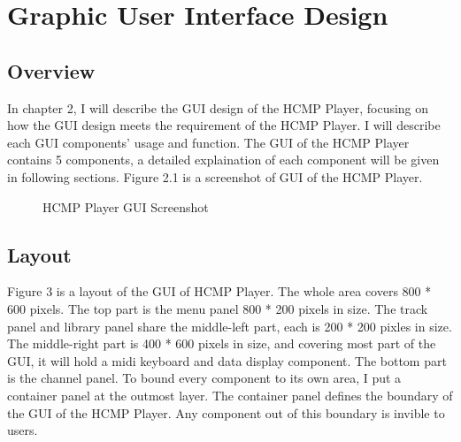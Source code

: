 
\chapter{Graphic User Interface Design} %

\section{Overview}
In chapter 2, I will describe the GUI design of the HCMP Player, focusing 
on how the GUI design meets the requirement of the HCMP Player. I will describe
each GUI components' 
usage and function. The GUI of the HCMP Player contains 5 components, 
a detailed explaination of each component will be given in following sections. 
Figure 2.1 is a screenshot of GUI of the HCMP Player. 

\begin{figure}[H]
\caption{HCMP Player GUI Screenshot}
\label{fig:speciation}
\end{figure}

\section{Layout}
Figure 3 is a layout of the GUI of HCMP Player. The whole area 
covers 800 * 600 pixels. The top part is the menu panel 800 * 200 pixels in size. 
The track panel and 
library panel share the middle-left part, each is 200 * 200 pixles in size. 
The middle-right part is 400 * 600 pixels in size, and covering most part of the GUI, 
it will hold a midi keyboard and data display component. The bottom part is the channel   
panel. To bound every component to its own area, I put a container panel at the outmost 
layer. The container panel defines the boundary of the GUI of the HCMP Player. Any 
component out of this boundary is invible to users. 

